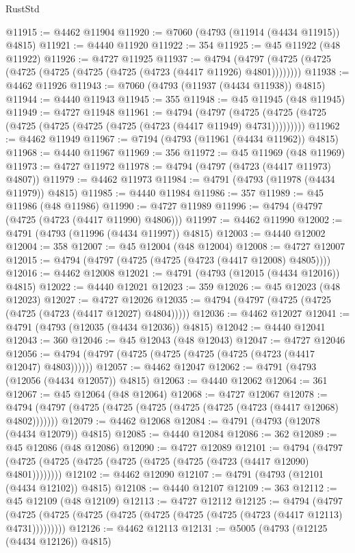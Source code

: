 \begin{lexlean}{RustStd}
\begin{coremodule}
{\begin{coremodule}
{{{{{{{{{{{{{{{{{{{{{{{{{{{{{{{{{{{{{{{{{{{{{{{{{{{{{{{{{{{{@11915 := @4462 @11904
@11920 := @7060 (@4793 (@11914 (@4434 @11915)) @4815)
@11921 := @4440 @11920
@11922 := 354
@11925 := @45 @11922 (@48 @11922)
@11926 := @4727 @11925
@11937 := @4794 (@4797 (@4725 (@4725 (@4725 (@4725 (@4725 (@4725 (@4723 (@4417 @11926) @4801))))))))
@11938 := @4462 @11926
@11943 := @7060 (@4793 (@11937 (@4434 @11938)) @4815)
@11944 := @4440 @11943
@11945 := 355
@11948 := @45 @11945 (@48 @11945)
@11949 := @4727 @11948
@11961 := @4794
    (@4797 (@4725 (@4725 (@4725 (@4725 (@4725 (@4725 (@4725 (@4723 (@4417 @11949) @4731)))))))))
@11962 := @4462 @11949
@11967 := @7194 (@4793 (@11961 (@4434 @11962)) @4815)
@11968 := @4440 @11967
@11969 := 356
@11972 := @45 @11969 (@48 @11969)
@11973 := @4727 @11972
@11978 := @4794 (@4797 (@4723 (@4417 @11973) @4807))
@11979 := @4462 @11973
@11984 := @4791 (@4793 (@11978 (@4434 @11979)) @4815)
@11985 := @4440 @11984
@11986 := 357
@11989 := @45 @11986 (@48 @11986)
@11990 := @4727 @11989
@11996 := @4794 (@4797 (@4725 (@4723 (@4417 @11990) @4806)))
@11997 := @4462 @11990
@12002 := @4791 (@4793 (@11996 (@4434 @11997)) @4815)
@12003 := @4440 @12002
@12004 := 358
@12007 := @45 @12004 (@48 @12004)
@12008 := @4727 @12007
@12015 := @4794 (@4797 (@4725 (@4725 (@4723 (@4417 @12008) @4805))))
@12016 := @4462 @12008
@12021 := @4791 (@4793 (@12015 (@4434 @12016)) @4815)
@12022 := @4440 @12021
@12023 := 359
@12026 := @45 @12023 (@48 @12023)
@12027 := @4727 @12026
@12035 := @4794 (@4797 (@4725 (@4725 (@4725 (@4723 (@4417 @12027) @4804)))))
@12036 := @4462 @12027
@12041 := @4791 (@4793 (@12035 (@4434 @12036)) @4815)
@12042 := @4440 @12041
@12043 := 360
@12046 := @45 @12043 (@48 @12043)
@12047 := @4727 @12046
@12056 := @4794 (@4797 (@4725 (@4725 (@4725 (@4725 (@4723 (@4417 @12047) @4803))))))
@12057 := @4462 @12047
@12062 := @4791 (@4793 (@12056 (@4434 @12057)) @4815)
@12063 := @4440 @12062
@12064 := 361
@12067 := @45 @12064 (@48 @12064)
@12068 := @4727 @12067
@12078 := @4794 (@4797 (@4725 (@4725 (@4725 (@4725 (@4725 (@4723 (@4417 @12068) @4802)))))))
@12079 := @4462 @12068
@12084 := @4791 (@4793 (@12078 (@4434 @12079)) @4815)
@12085 := @4440 @12084
@12086 := 362
@12089 := @45 @12086 (@48 @12086)
@12090 := @4727 @12089
@12101 := @4794 (@4797 (@4725 (@4725 (@4725 (@4725 (@4725 (@4725 (@4723 (@4417 @12090) @4801))))))))
@12102 := @4462 @12090
@12107 := @4791 (@4793 (@12101 (@4434 @12102)) @4815)
@12108 := @4440 @12107
@12109 := 363
@12112 := @45 @12109 (@48 @12109)
@12113 := @4727 @12112
@12125 := @4794
    (@4797 (@4725 (@4725 (@4725 (@4725 (@4725 (@4725 (@4725 (@4723 (@4417 @12113) @4731)))))))))
@12126 := @4462 @12113
@12131 := @5005 (@4793 (@12125 (@4434 @12126)) @4815)
}}}}}}}}}}}}}}}}}}}}}}}}}}}}}}}}}}}}}}}}}}}}}}}}}}}}}}}}}}}}
\end{coremodule}}
\end{coremodule}
\end{lexlean}
